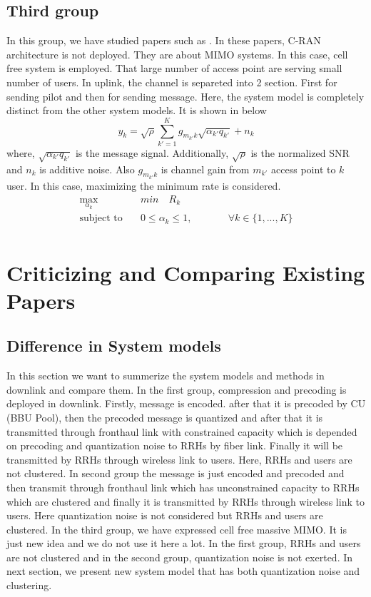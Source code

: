 \documentclass[journal,onecolumn,11pt,draftcls,doublespace]{IEEEtran}
\begin{document}
\subsection{Third group}
In this group, we have studied papers such as \cite{cell, 88}. In these papers, C-RAN architecture is not deployed. They are about MIMO systems. In this case, cell free system is employed. 
That large number of access point are serving small number of users. In uplink, the channel is separeted into 2 section. First for sending pilot and then for sending message. Here, the system model is completely distinct from the other system models. It is shown in below
\begin{equation}
y_k = \sqrt{\rho}\sum_{k'=1}^K g_{m_{k'} k} \sqrt{\alpha_{k'} q_{k'}} + n_k
\end{equation}   
where, $\sqrt{\alpha_{k'} q_{k'}}$ is the message signal. Additionally, $\sqrt{\rho}$ is the normalized SNR and $n_k$ is additive noise. Also $ g_{m_{k'} k}$ is channel gain from $m_{k'}$ access point to $k$ user. In this case, maximizing the minimum rate is considered. 
   \begin{equation}
\begin{aligned}
\max\limits_{\alpha_k}   \quad & min \quad  R_k\\
\text{subject to} \quad  & 0\leq \alpha_k \leq 1, && \qquad \forall k \in \{1,...,K\}  \\
\end{aligned}			
\end{equation}
 \section{Criticizing and Comparing Existing Papers}
 \subsection{Difference in System models}
 In this section we want to summerize the system models and methods in downlink and compare them. In the first group, compression and precoding is deployed in downlink. Firstly, message is encoded. after that it is precoded by CU (BBU Pool), then the precoded message is quantized and after that it is transmitted through fronthaul link with constrained capacity which is 
 depended on precoding and quantization noise
 to RRHs by fiber link. Finally it will be transmitted by RRHs through wireless link to users. Here, RRHs and users are not clustered.
  In second group the message is just encoded and precoded and then transmit through fronthaul link which has unconstrained capacity to RRHs which are clustered and finally it is transmitted  by RRHs through wireless link to users. Here quantization noise is not considered but RRHs and users are clustered.
  In the third group, we have expressed cell free massive MIMO. It is just new idea and we do not use it here a lot. 
  In the first group, RRHs and users are not clustered and in the second group, quantization noise is not exerted. In next section, we present new system model that has both quantization noise and clustering. 
\end{document}
